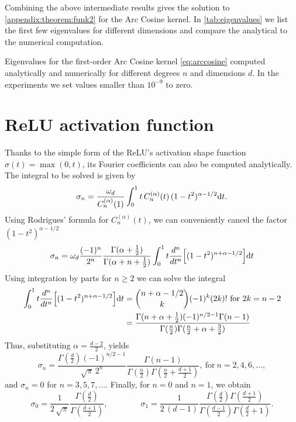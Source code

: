 Combining the above intermediate results gives the solution to \cref{appendix:theorem:funk2} for the Arc Cosine kernel. In \cref{tab:eigenvalues} we list the first few eigenvalues for different dimensions and compare the analytical to the numerical computation. 

\begin{table}[tbh]
    \centering
    \caption{Eigenvalues for the first-order Arc Cosine kernel \cref{eq:arccosine}  computed analytically and numerically for different degrees $n$ and dimensions $d$. In the experiments we set values smaller than $10^{-9}$ to zero. \label{tab:eigenvalues}}
    \vspace{.2cm}
    
\end{table}


\section{ReLU activation function}

Thanks to the simple form of the ReLU's activation shape function $\sigma(t) = \max(0, t)$, its Fourier coefficients can also be computed analytically. The integral to be solved is given by
\begin{equation}
    \sigma_{n} = 
   \frac{\omega_{d}}{C_n^{(\alpha)}(1)} 
   \int_{0}^1 t\,C_n^{(\alpha)}(t)\,(1 - t^2)^{\alpha - 1/2} \mathrm{d}{t}.
\end{equation}
Using Rodrigues' formula for $C_n^{(\alpha)}(t)$, we can conveniently cancel the factor $(1 - t^2)^{\alpha - 1/2}$
\begin{equation}
    \sigma_{n} = 
    \omega_{d}
  {\frac {(-1)^{n}}{2^{n}}}{\frac {\Gamma (\alpha +{\frac {1}{2}})}{\Gamma (\alpha +n+{\frac {1}{2}})}} 
  \int_0^1 t {\frac {d^{n}}{dt^{n}}}\left[(1-t^{2})^{n+\alpha -1/2}\right] \calcd{t}
\end{equation}
Using integration by parts for $n \ge 2$ we can solve the integral \citep[Appendix D]{bach2017breaking}
\begin{align}
  \int_0^1 t {\frac {d^{n}}{dt^{n}}}\left[(1-t^{2})^{n+\alpha -1/2}\right] \calcd{t} &= 
    \binom{n + \alpha - 1/2}{k} (-1)^k (2k)!\ \text{for}\ 2k= n - 2 \\
    &= \frac{ \Gamma(n + \alpha + \frac{1}{2}) (-1)^{n/2-1} \Gamma(n-1)}{\Gamma(\frac{n}{2}) \Gamma(\frac{n}{2} + \alpha + \frac{3}{2})}
\end{align}
Thus, substituting $\alpha = \frac{d-2}{2}$, yields
\begin{equation}
    \sigma_{n} = 
        \frac{\Gamma(\frac{d}{2}) (-1)^{n/2 - 1}}{\sqrt{\pi}\,2^n} \frac{\Gamma(n-1)}{\Gamma(\frac{n}{2}) \Gamma(\frac{n}{2} + \frac{d+1}{2})},\ \text{for}\ n = 2, 4, 6, \ldots,
\end{equation}
and $\sigma_{n}=0$ for $n=3, 5, 7, \dots$. Finally, for $n = 0$ and $n = 1$, we obtain
\begin{equation}
    \sigma_0 = \frac{1}{2\, \sqrt{\pi}} \frac{\Gamma(\frac{d}{2})}{\Gamma(\frac{d+1}{2})}, \qquad \qquad
    \sigma_1 = \frac{1}{2\, (d-1)} \frac{\Gamma(\frac{d}{2}) \Gamma(\frac{d+1}{2})}{\Gamma(\frac{d-1}{2}) \Gamma(\frac{d}{2} + 1)}.
\end{equation}

